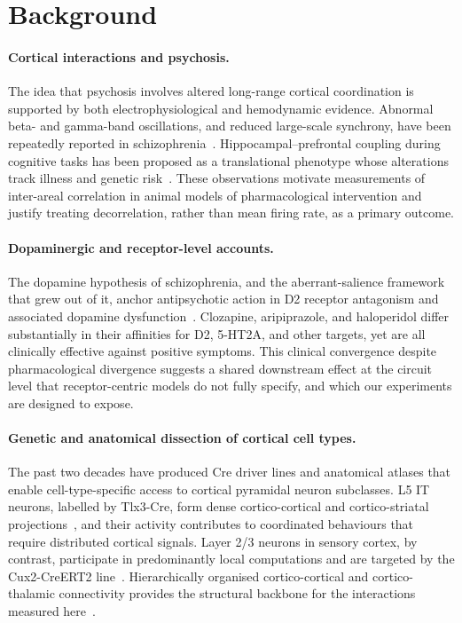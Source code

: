 \documentclass[11pt]{article}
\begin{document}
\section{Background}

\paragraph{Cortical interactions and psychosis.}
The idea that psychosis involves altered long-range cortical coordination is supported by both electrophysiological and hemodynamic evidence. Abnormal beta- and gamma-band oscillations, and reduced large-scale synchrony, have been repeatedly reported in schizophrenia~\citep{uhlhaas2015oscillations, uhlhaas2013highfrequency}. Hippocampal--prefrontal coupling during cognitive tasks has been proposed as a translational phenotype whose alterations track illness and genetic risk~\citep{bahner2017hippocampal}. These observations motivate measurements of inter-areal correlation in animal models of pharmacological intervention and justify treating decorrelation, rather than mean firing rate, as a primary outcome.

\paragraph{Dopaminergic and receptor-level accounts.}
The dopamine hypothesis of schizophrenia, and the aberrant-salience framework that grew out of it, anchor antipsychotic action in D2 receptor antagonism and associated dopamine dysfunction~\citep{howes2009dopamine, kambeitz2014alterations}. Clozapine, aripiprazole, and haloperidol differ substantially in their affinities for D2, 5-HT2A, and other targets, yet are all clinically effective against positive symptoms. This clinical convergence despite pharmacological divergence suggests a shared downstream effect at the circuit level that receptor-centric models do not fully specify, and which our experiments are designed to expose.

\paragraph{Genetic and anatomical dissection of cortical cell types.}
The past two decades have produced Cre driver lines and anatomical atlases that enable cell-type-specific access to cortical pyramidal neuron subclasses. L5 IT neurons, labelled by Tlx3-Cre, form dense cortico-cortical and cortico-striatal projections~\citep{liu2024celltype, matho2021genetic, biccn2021multimodal, shinotsuka2023layer5, atudorei2024bilateral}, and their activity contributes to coordinated behaviours that require distributed cortical signals. Layer 2/3 neurons in sensory cortex, by contrast, participate in predominantly local computations and are targeted by the Cux2-CreERT2 line~\citep{daigle2018suite}. Hierarchically organised cortico-cortical and cortico-thalamic connectivity provides the structural backbone for the interactions measured here~\citep{harris2019hierarchical, siegle2021survey}.
\end{document}

